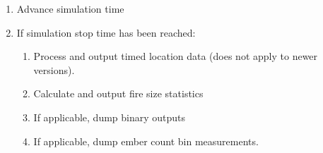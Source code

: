 \begin{enumerate}
\begin{enumerate}
        \item Calculate extended attack containment
        \item Dump main outputs
    \end{enumerate}
    \item Advance simulation time
    \item If simulation stop time has been reached:
    \begin{enumerate}
        \item Process and output timed location data (does not apply to newer versions).
        \item Calculate and output fire size statistics
        \item If applicable, dump binary outputs
        \item If applicable, dump ember count bin measurements.
    \end{enumerate}
\end{enumerate}



